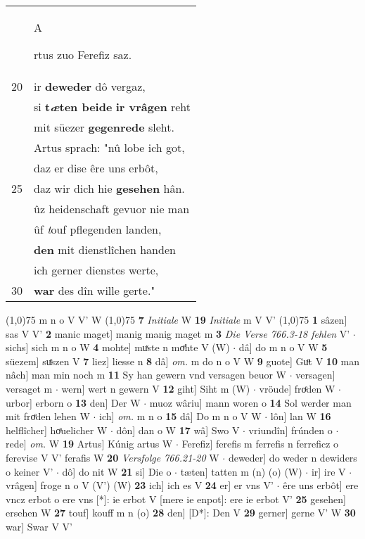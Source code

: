 \documentclass[8pt,a4paper,notitlepage]{article}
\begin{document}
\begin{table}[ht]
\begin{minipage}[t]{0.5\linewidth}
\begin{tabular}{rl}
 & \begin{large}A\end{large}rtus zuo Ferefiz saz.\\ 
20 & ir \textbf{deweder} dô vergaz,\\ 
 & si \textbf{t\textit{æ}ten beide} \textbf{ir vrâgen} reht\\ 
 & mit süezer \textbf{gegenrede} sleht.\\ 
 & Artus sprach: "nû lobe ich got,\\ 
 & daz er dise êre uns erbôt,\\ 
25 & daz wir dich hie \textbf{gesehen} hân.\\ 
 & ûz heidenschaft gevuor nie man\\ 
 & ûf \textit{t}ouf pflegenden landen,\\ 
 & \textbf{den} mit dienstlîchen handen\\ 
 & ich gerner dienstes werte,\\ 
30 & \textbf{war} des dîn wille gerte."\\ 
\end{tabular}
\scriptsize
\line(1,0){75} \newline
m n o V V' W \newline
\line(1,0){75} \newline
\textbf{7} \textit{Initiale} W  \textbf{19} \textit{Initiale} m V V'  \newline
\line(1,0){75} \newline
\textbf{1} sâzen] sas V V' \textbf{2} manic maget] manig manig maget m \textbf{3} \textit{Die Verse 766.3-18 fehlen} V'   $\cdot$ sichs] sich m n o W \textbf{4} mohte] muͯste n moͤhte V (W)  $\cdot$ dâ] do m n o V W \textbf{5} süezem] suͤszen V \textbf{7} liez] liesse n \textbf{8} dâ] \textit{om.} m do n o V W \textbf{9} guote] Guͦt V \textbf{10} man nâch] man min noch m \textbf{11} Sy han gewern vnd versagen beuor W  $\cdot$ versagen] versaget m  $\cdot$ wern] wert n gewern V \textbf{12} giht] Siht m (W)  $\cdot$ vröude] froͤden W  $\cdot$ urbor] erborn o \textbf{13} den] Der W  $\cdot$ muoz wâriu] mann woren o \textbf{14} Sol werder man mit froͤden lehen W  $\cdot$ ich] \textit{om.} m n o \textbf{15} dâ] Do m n o V W  $\cdot$ lôn] lan W \textbf{16} helflîcher] hoͤuelicher W  $\cdot$ dôn] dan o W \textbf{17} wâ] Swo V  $\cdot$ vriundîn] frúnden o  $\cdot$ rede] \textit{om.} W \textbf{19} Artus] Kúnig artus W  $\cdot$ Ferefiz] ferefis m ferrefis n ferreficz o ferevise V V' ferafis W \textbf{20} \textit{Versfolge 766.21-20} W   $\cdot$ deweder] do weder n dewiders o keiner V'  $\cdot$ dô] do nit W \textbf{21} si] Die o  $\cdot$ tæten] tatten m (n) (o) (W)  $\cdot$ ir] ire V  $\cdot$ vrâgen] froge n o V (V') (W) \textbf{23} ich] ich es V \textbf{24} er] er vns V'  $\cdot$ êre uns erbôt] ere vncz erbot o ere vns [*]: ie erbot V [mere ie enpot]: ere ie erbot V' \textbf{25} gesehen] ersehen W \textbf{27} touf] kouff m n (o) \textbf{28} den] [D*]: Den V \textbf{29} gerner] gerne V' W \textbf{30} war] Swar V V' \newline
\end{minipage}
\end{table}
\end{document}
